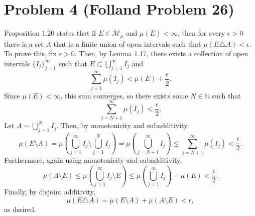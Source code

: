 \documentclass{article}
\begin{document}
\section{Problem 4 (Folland Problem 26)}
Proposition 1.20 states that if $E\in\mathcal M_\mu$ and $\mu(E)<\infty$, then for every $\epsilon>0$ there is a set $A$ that is a finite union of open intervals such that $\mu(E\triangle A)<\epsilon$. To prove this, fix $\epsilon>0$. Then, by Lemma 1.17, there exists a collection of open intervals $\{I_j\}_{j=1}^\infty$ such that $E\subset\bigcup_{j=1}^\infty I_j$ and 
\[
\sum_{j=1}^\infty\mu(I_j)<\mu(E)+\frac{\epsilon}{2}.
\]
Since $\mu(E)<\infty$, this sum converges, so there exists some $N\in\mathbb{N}$ such that
\[
\sum_{j=N+1}^\infty\mu(I_j)<\frac{\epsilon}{2}.
\]
Let $A=\bigcup_{j=1}^N I_j$. Then, by monotonicity and subadditivity
\[
\mu(E\setminus A)=\mu\left(\bigcup_{j=1}^\infty I_j\setminus\bigcup_{j=1}^N I_j\right)=\mu\left(\bigcup_{j=N+1}^\infty I_j\right)\leq\sum_{j=N+1}^\infty\mu(I_j)<\frac{\epsilon}{2}.
\]
Furthermore, again using monotonicity and subadditivity,
\[
\mu(A\setminus E)\leq\mu\left(\bigcup_{j=1}^\infty I_j\setminus E\right)\leq\mu\left(\bigcup_{j=1}^\infty I_j\right)-\mu(E)<\frac{\epsilon}{2}.
\]
Finally, by disjoint additivity, 
\[
\mu(E\triangle A)=\mu(E\setminus A)+\mu(A\setminus E)<\epsilon,
\]
as desired.
\end{document}
